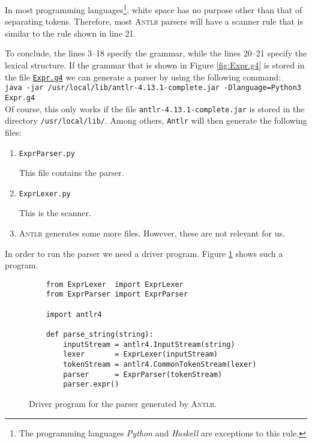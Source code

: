 \begin{enumerate}
      In most programming languages\footnote{
        The programming languages \textsl{Python} and \textsl{Haskell} are exceptions to this rule.},
      white space has no purpose other than that of separating  tokens.  
      Therefore, most \textsc{Antlr} parsers will have a scanner rule that is similar to
      the rule shown in line 21. 
\end{enumerate}
To conclude, the lines 3--18 specify the grammar, while the lines 20--21 specify the 
lexical structure.  If the grammar that is shown in Figure \ref{fig:Expr.g4} is stored in the file
\href{https://github.com/karlstroetmann/Formal-Languages/blob/master/ANTLR4-Python/PureExprParser/Expr.g4}{\texttt{Expr.g4}} 
we can generate a parser by using the following command:
\\[0.2cm]
\hspace*{1.3cm}
\texttt{java -jar /usr/local/lib/antlr-4.13.1-complete.jar -Dlanguage=Python3 Expr.g4}
\\[0.2cm]
Of course, this only works if the file \texttt{antlr-4.13.1-complete.jar} is stored in the directory
\texttt{/usr/local/lib/}.  Among others, \texttt{Antlr} will then generate the following files:
\begin{enumerate}
\item \texttt{ExprParser.py}

      This file contains the parser.
\item \texttt{ExprLexer.py}

      This is the scanner.
\item \textsc{Antlr} generates some more files.  However, these are not relevant for us.
\end{enumerate}

In order to run the parser we need a driver program.  Figure \ref{fig:PureParser.ipynb} shows such a program.

\begin{figure}[!ht]
\centering
\begin{verbatim}
    from ExprLexer  import ExprLexer
    from ExprParser import ExprParser
    
    import antlr4
    
    def parse_string(string): 
        inputStream = antlr4.InputStream(string)
        lexer       = ExprLexer(inputStream)
        tokenStream = antlr4.CommonTokenStream(lexer)
        parser      = ExprParser(tokenStream)
        parser.expr()
\end{verbatim}
\vspace*{-0.3cm}
\caption{Driver program for the parser generated by \textsc{Antlr}.}
\label{fig:PureParser.ipynb}
\end{figure}

